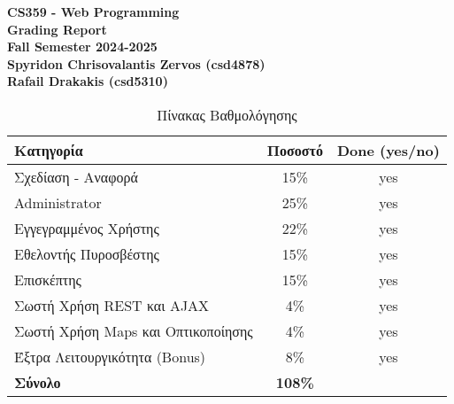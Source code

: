 \documentclass[a4paper, 12pt]{article}
\begin{document}
\begin{center}
    \textbf{\Large CS359 - Web Programming}\\[0.5cm]
    \textbf{\Large Grading Report}\\[0.5cm]
    \textbf{\large Fall Semester 2024-2025}\\[1cm]
    \textbf{Spyridon Chrisovalantis Zervos (csd4878)}\\[0.2cm]
    \textbf{Rafail Drakakis (csd5310)}
\end{center}

\begin{table}[h!]
    \centering
    \begin{tabular}{|l|c|c|}
        \hline
        \textbf{Κατηγορία} & \textbf{Ποσοστό} & \textbf{Done (yes/no)} \\ \hline
        Σχεδίαση - Αναφορά & 15\% & yes \\ \hline
        Administrator & 25\% & yes \\ \hline
        Εγγεγραμμένος Χρήστης & 22\% & yes \\ \hline
        Εθελοντής Πυροσβέστης & 15\% & yes \\ \hline
        Επισκέπτης & 15\% & yes \\ \hline
        Σωστή Χρήση REST και AJAX & 4\% & yes \\ \hline
        Σωστή Χρήση Maps και Οπτικοποίησης & 4\% & yes \\ \hline
        Έξτρα Λειτουργικότητα (Bonus) & 8\% & yes \\ \hline
        \textbf{Σύνολο} & \textbf{108\%} & \\ \hline
    \end{tabular}
    \caption{Πίνακας Βαθμολόγησης}
\end{table}
\end{document}
